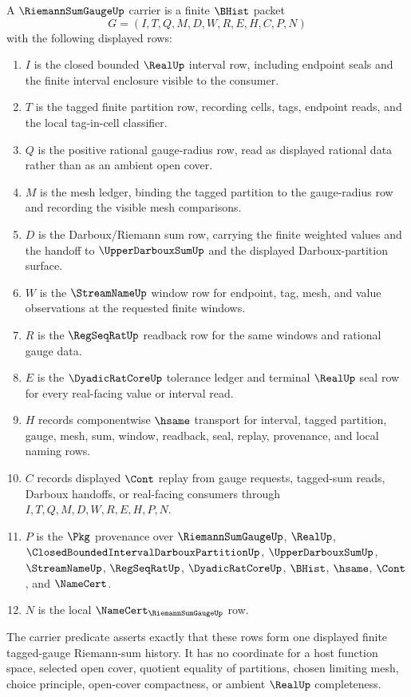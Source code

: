 \begin{definition}
\label{def:riemann-sum-gauge-carrier}
A $\RiemannSumGaugeUp$ carrier is a finite $\BHist$ packet
$$
G=(I,T,Q,M,D,W,R,E,H,C,P,N)
$$
with the following displayed rows:
\begin{enumerate}
\item $I$ is the closed bounded $\RealUp$ interval row, including endpoint seals and the finite interval enclosure visible to the consumer.
\item $T$ is the tagged finite partition row, recording cells, tags, endpoint reads, and the local tag-in-cell classifier.
\item $Q$ is the positive rational gauge-radius row, read as displayed rational data rather than as an ambient open cover.
\item $M$ is the mesh ledger, binding the tagged partition to the gauge-radius row and recording the visible mesh comparisons.
\item $D$ is the Darboux/Riemann sum row, carrying the finite weighted values and the handoff to $\UpperDarbouxSumUp$ and the displayed Darboux-partition surface.
\item $W$ is the $\StreamNameUp$ window row for endpoint, tag, mesh, and value observations at the requested finite windows.
\item $R$ is the $\RegSeqRatUp$ readback row for the same windows and rational gauge data.
\item $E$ is the $\DyadicRatCoreUp$ tolerance ledger and terminal $\RealUp$ seal row for every real-facing value or interval read.
\item $H$ records componentwise $\hsame$ transport for interval, tagged partition, gauge, mesh, sum, window, readback, seal, replay, provenance, and local naming rows.
\item $C$ records displayed $\Cont$ replay from gauge requests, tagged-sum reads, Darboux handoffs, or real-facing consumers through $I,T,Q,M,D,W,R,E,H,P,N$.
\item $P$ is the $\Pkg$ provenance over $\RiemannSumGaugeUp$, $\RealUp$, $\ClosedBoundedIntervalDarbouxPartitionUp$, $\UpperDarbouxSumUp$, $\StreamNameUp$, $\RegSeqRatUp$, $\DyadicRatCoreUp$, $\BHist$, $\hsame$, $\Cont$, and $\NameCert$.
\item $N$ is the local $\NameCert_{\RiemannSumGaugeUp}$ row.
\end{enumerate}
The carrier predicate asserts exactly that these rows form one displayed finite tagged-gauge Riemann-sum history. It has no coordinate for a host function space, selected open cover, quotient equality of partitions, chosen limiting mesh, choice principle, open-cover compactness, or ambient $\RealUp$ completeness.
\end{definition}

